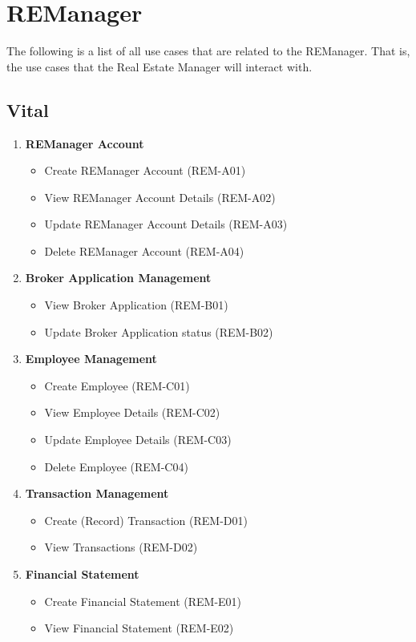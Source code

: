 \documentclass[11pt]{article}
\begin{document}
	\section{REManager}
	\begin{flushleft}
		The following is a list of all use cases that are related to the REManager. That is, the use cases that the Real Estate Manager will interact with.
	\end{flushleft}
	
		\subsection{Vital}
		\begin{enumerate}[i]
			\item \textbf{REManager Account}
			\begin{itemize}
				\item Create REManager Account (REM-A01)
				\item View REManager Account Details (REM-A02)
				\item Update REManager Account Details (REM-A03)
				\item Delete REManager Account (REM-A04)
			\end{itemize}
			
			\item \textbf{Broker Application Management}
			\begin{itemize}
				\item View Broker Application (REM-B01)
				\item Update Broker Application status (REM-B02)
			\end{itemize}
			
			\item \textbf{Employee Management}
			\begin{itemize}
				\item Create Employee (REM-C01)
				\item View Employee Details (REM-C02)
				\item Update Employee Details (REM-C03)
				\item Delete Employee (REM-C04)
			\end{itemize}
			
			\item \textbf{Transaction Management}
			\begin{itemize}
				\item Create (Record) Transaction  (REM-D01)
				\item View Transactions  (REM-D02)
			\end{itemize}
			
			\item \textbf{Financial Statement}
			\begin{itemize}
				\item Create Financial Statement (REM-E01)
				\item View Financial Statement (REM-E02)
			\end{itemize}
		\end{enumerate}
		
\end{document}

